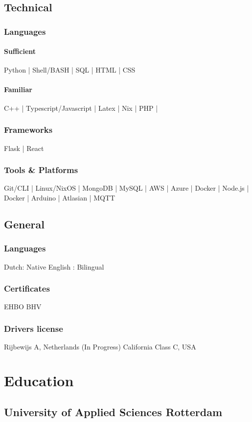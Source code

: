 \documentclass[11pt, twoside, a4paper, titlepage]{article}
\begin{document}
\subsection{Technical}
\subsubsection{Languages}
\paragraph{Sufficient}
	Python | Shell/BASH | SQL | HTML | CSS 
\paragraph{Familiar}
	C++ | Typescript/Javascript | Latex | Nix | PHP |
\subsubsection{Frameworks}
	Flask | React
\subsubsection{Tools \& Platforms}
	Git/CLI | Linux/NixOS | MongoDB | MySQL | AWS | Azure | Docker | Node.js | Docker | Arduino | Atlasian | MQTT

\subsection{General}

\subsubsection{Languages}
Dutch: Native
English : Bilingual
\subsubsection{Certificates}
EHBO
BHV
\subsubsection{Drivers license}
Rijbewijs A, Netherlands (In Progress)
California Class C, USA

\section{Education}
\subsection{University of Applied Sciences Rotterdam}
\end{document}
